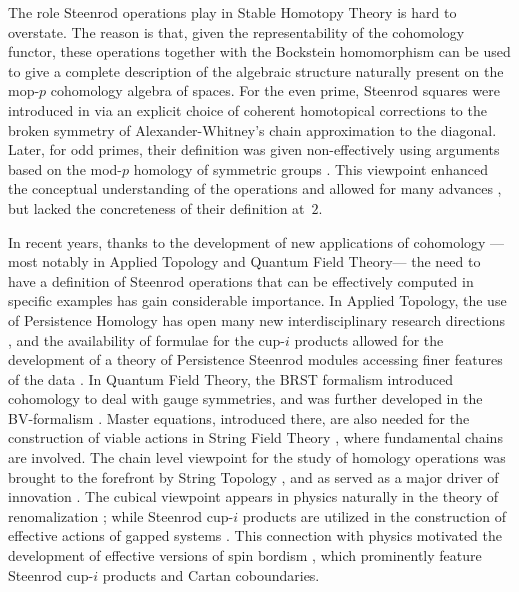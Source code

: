 \documentclass[A4]{amsart}
\theoremstyle{definition}
\begin{document}
The role Steenrod operations play in Stable Homotopy Theory is hard to overstate. The reason is that, given the representability of the cohomology functor, these operations together with the Bockstein homomorphism can be used to give a complete description of the algebraic structure naturally present on the mop-$p$ \mbox{cohomology} algebra of spaces. For the even prime, Steenrod squares were introduced in \cite{steenrod47products} via an explicit choice of coherent homotopical corrections to the broken symmetry of Alexander-Whitney's chain approximation to the diagonal. Later, for odd primes,	their definition was given non-effectively using arguments based on the mod-$p$ homology of symmetric groups \cites{steenrod53symmetric, steenrod53cyclic, steenrod62operations}. This viewpoint enhanced the conceptual understanding of the operations and allowed for many advances \cites{adem1952iteration, milnor1958dual, adams1995stable}, but lacked the concreteness of their definition at~$2$.

In recent years, thanks to the development of new applications of cohomology ---most notably in Applied Topology and Quantum Field Theory--- the need to have a definition of Steenrod operations that can be effectively computed in specific examples has gain considerable importance. In Applied Topology, the use of Persistence Homology \cites{carlsson2009data, edelsbrunner2008persistent} has open many new interdisciplinary research directions \cites{de2007coverage,chan2013topology,lee2017quantifying}, and the availability of formulae for the cup-$i$ products allowed for the development of a theory of Persistence Steenrod modules accessing finer features of the data \cite{medina2018persistence}. In Quantum Field Theory, the BRST formalism \cites{BRS,Tyutin,KugoOjima} introduced cohomology to deal with gauge symmetries, and was further developed in the BV-formalism \cite{BV}. Master equations, introduced there, are also needed for the construction of viable actions in String Field Theory \cite{Zwiebach}, where fundamental chains are involved. The chain level viewpoint for the study of homology operations was brought to the forefront by String Topology \cite{Sullivanoverview}, and as served as a major driver of innovation \cites{TZ, hoch2}. The cubical viewpoint appears in physics naturally in the theory of renomalization \cite{KreimerCubical}; while Steenrod cup-$i$ products are utilized in the construction of effective actions of gapped systems \cite{kapustin2017fermionic}. This connection with physics motivated the development of effective versions of spin bordism \cites{brumfiel2016pontrjagin, brumfiel2018pontrjagin}, which prominently feature Steenrod cup-$i$ products and Cartan coboundaries.
\end{document}
